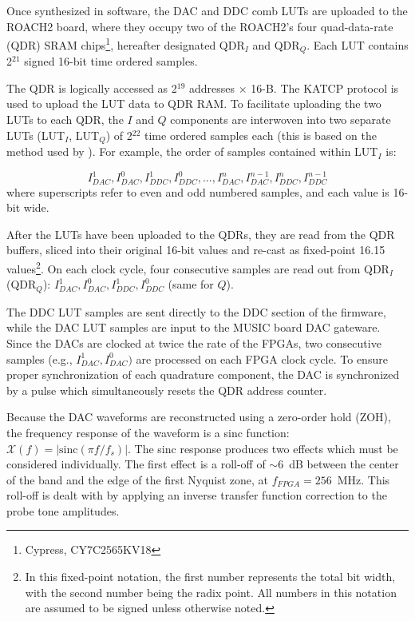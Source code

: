 Once synthesized in software, the DAC and DDC comb LUTs are uploaded to the ROACH2 board, where they occupy two of the ROACH2's four quad-data-rate (QDR) SRAM chips\footnote{Cypress, CY7C2565KV18}, hereafter designated QDR$_{I}$ and QDR$ _{Q}$. Each LUT contains 2$^{21}$ signed 16-bit time ordered samples.

The QDR is logically accessed as 2$^{19}$ addresses $\times$ 16-B. The KATCP protocol is used to upload the LUT data to QDR RAM. To facilitate uploading the two LUTs to each QDR, the $I$ and $Q$ components are interwoven into two separate LUTs (LUT$_{I}$, LUT$_{Q}$) of 2$^{22}$ time ordered samples each (this is based on the method used by \citet{mchugh2012readout}). For example, the order of samples contained within LUT$_{I}$ is:

\begin{equation} I_{DAC}^{1}, I_{DAC}^{0}, I_{DDC}^{1},I_{DDC}^{0}, ... , I_{DAC}^{n}, I_{DAC}^{n -1 }, I_{DDC}^{n}, I_{DDC}^{n - 1} \end{equation}
where superscripts refer to even and odd numbered samples, and each value is 16-bit wide.

After the LUTs have been uploaded to the QDRs, they are read from the QDR buffers, sliced into their original 16-bit values and re-cast as fixed-point 16.15 values\footnote{In this fixed-point notation, the first number represents the total bit width, with the second number being the radix point. All numbers in this notation are assumed to be signed unless otherwise noted.}. On each clock cycle, four consecutive samples are read out from QDR$_{I}$ (QDR$_{Q}$): $I_{DAC}^{1}, I_{DAC}^{0}, I_{DDC}^{1}, I_{DDC}^{0}$ (same for $Q$).

The DDC LUT samples are sent directly to the DDC section of the firmware, while the DAC LUT samples are input to the MUSIC board DAC gateware. Since the DACs are clocked at twice the rate of the FPGAs, two consecutive samples (e.g., $I_{DAC}^{1}, I_{DAC}^{0})$ are processed on each FPGA clock cycle. To ensure proper synchronization of each quadrature component, the DAC is synchronized by a pulse which simultaneously resets the QDR address counter.

Because the DAC waveforms are reconstructed using a zero-order hold (ZOH), the frequency response of the waveform is a sinc function: $\mathcal{X}(f) = \left|{\mathrm{sinc}}(\pi f/f_{s}) \right|$. The sinc response produces two effects which must be considered individually. The first effect is a roll-off of $\sim$6~dB between the center of the band and the edge of the first Nyquist zone, at $f_{FPGA} = 256$~MHz. This roll-off is dealt with by applying an inverse transfer function correction to the probe tone amplitudes.

